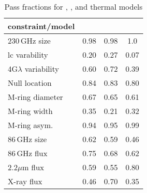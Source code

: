 \begin{table*}
\caption{Pass fractions for \kharma, \bhac, and \hamr thermal models}
\centering
\begin{tabular}{l|ccc}
\hline
constraint/model	& \kharma	&	\bhac	&	\hamr \\
\hline
230\,GHz size	&	0.98	&	0.98   &	1.0		\\
lc varability	&	0.20	&	0.27   &	0.07	\\
4G$\lambda$ variability	&	0.60	&	0.72   &	0.39	\\
Null location	&	0.84	&	0.83   &	0.80	\\
M-ring diameter	&	0.67	&	0.65   &	0.61	\\
M-ring width	&	0.35	&	0.21   &	0.32	\\
M-ring asym.	&	0.94	&	0.95   &	0.99	\\
86\,GHz size	&	0.62	&	0.59   &	0.46	\\
86\,GHz flux	&	0.75	&	0.68   &	0.62	\\
2.2$\mu$m flux	&	0.59	&	0.55   &	0.80	\\
X-ray flux		&	0.46	&	0.70   &	0.35	\\
\hline
\end{tabular}
\label{tab:passfraction_thermal}
\end{table*} 


